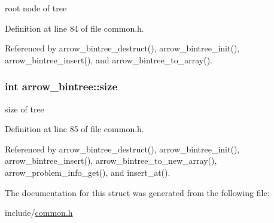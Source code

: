 root node of tree 

Definition at line 84 of file common.h.

Referenced by arrow\_\-bintree\_\-destruct(), arrow\_\-bintree\_\-init(), arrow\_\-bintree\_\-insert(), and arrow\_\-bintree\_\-to\_\-array().\hypertarget{structarrow__bintree_7570628df0b5317cc8e240499ba12974}{
\subsubsection{\setlength{\rightskip}{0pt plus 5cm}int {\bf arrow\_\-bintree::size}}}
\label{structarrow__bintree_7570628df0b5317cc8e240499ba12974}


size of tree 

Definition at line 85 of file common.h.

Referenced by arrow\_\-bintree\_\-destruct(), arrow\_\-bintree\_\-init(), arrow\_\-bintree\_\-insert(), arrow\_\-bintree\_\-to\_\-new\_\-array(), arrow\_\-problem\_\-info\_\-get(), and insert\_\-at().

The documentation for this struct was generated from the following file:\begin{CompactItemize}
\item 
include/\hyperlink{common_8h}{common.h}\end{CompactItemize}
